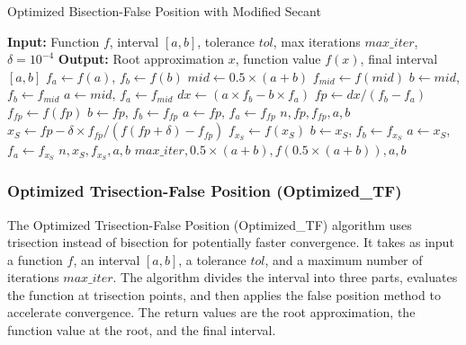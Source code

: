 \documentclass[reprint, amsmath, amssymb, aps, prl]{revtex4-2}
\begin{document}
\vspace{1em}
\begin{algorithm}[h!]
\caption{Optimized Bisection-False Position with Modified Secant}
\begin{algorithmic}[1]
\State \textbf{Input:} Function $f$, interval $[a, b]$, tolerance $tol$, max iterations $max\_iter$, $\delta = 10^{-4}$
\State \textbf{Output:} Root approximation $x$, function value $f(x)$, final interval $[a, b]$
\State $f_a \gets f(a)$, $f_b \gets f(b)$
    \State $mid \gets 0.5 \times (a + b)$
    \State $f_{mid} \gets f(mid)$
        \State $b \gets mid$, $f_b \gets f_{mid}$
    \Else
        \State $a \gets mid$, $f_a \gets f_{mid}$
    \EndIf
    \State $dx \gets (a \times f_b - b \times f_a)$
    \State $fp \gets dx / (f_b - f_a)$
    \State $f_{fp} \gets f(fp)$
        \State $b \gets fp$, $f_b \gets f_{fp}$
    \Else
        \State $a \gets fp$, $f_a \gets f_{fp}$
    \EndIf
        \State \Return $n, fp, f_{fp}, a, b$
    \EndIf
    \State $x_S \gets fp - \delta \times f_{fp} / (f(fp + \delta) - f_{fp})$
        \State $f_{x_S} \gets f(x_S)$
                \State $b \gets x_S$, $f_b \gets f_{x_S}$
            \Else
                \State $a \gets x_S$, $f_a \gets f_{x_S}$
            \EndIf
                \State \Return $n, x_S, f_{x_S}, a, b$
            \EndIf
        \EndIf
    \EndIf
\EndFor
\State \Return $max\_iter, 0.5 \times (a + b), f(0.5 \times (a + b)), a, b$
\end{algorithmic}
\end{algorithm}
\vspace{1em}

\subsubsection{Optimized Trisection-False Position (Optimized\_TF)}

The Optimized Trisection-False Position (Optimized\_TF) algorithm uses trisection instead of bisection for potentially faster convergence. It takes as input a function $f$, an interval $[a, b]$, a tolerance $tol$, and a maximum number of iterations $max\_iter$. The algorithm divides the interval into three parts, evaluates the function at trisection points, and then applies the false position method to accelerate convergence. The return values are the root approximation, the function value at the root, and the final interval.
\end{document}
